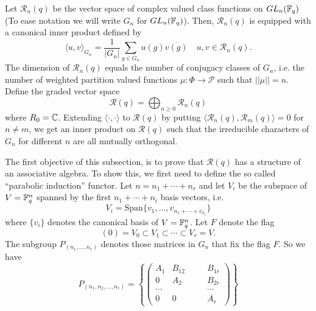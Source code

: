 Let $\mathcal{R}_n(q)$ be the vector space of complex valued class functions on $GL_n(\mathbb{F}_q)$ (To ease notation we will write $G_n$ for $GL_n(\mathbb{F}_q)$). Then, $\mathcal{R}_n(q)$ is equipped with a canonical inner product defined by 
\begin{equation}\label{Equation: inner product for characters}
    \langle u,v\rangle_{G_n}=\frac{1}{|G_n|}\sum_{g\in G_n}u(g)\overline{v(g)}\quad u,v\in \mathcal{R}_n(q).
\end{equation}
The dimension of $\mathcal{R}_n(q)$ equals the number of conjugacy classes of $G_n$, i.e. the number of weighted partition valued functions $\mu:\Phi\rightarrow \mathcal{P}$ such that $||\mu||=n$. Define the graded vector space
\begin{equation}
    \mathcal{R}(q) = \bigoplus_{n\geq0}\mathcal{R}_n(q)
\end{equation}
where $R_0=\mathbb{C}$. Extending $\langle\cdot,\cdot\rangle$ to $\mathcal{R}(q)$ by putting $\langle\mathcal{R}_n(q),\mathcal{R}_m(q)\rangle=0$ for $n\neq m$, we get an inner product on $\mathcal{R}(q)$ such that the irreducible characters of $G_n$ for different $n$ are all mutually orthogonal.\par
The first objective of this subsection, is to prove that $\mathcal{R}(q)$ has a structure of an associative algebra. To show this, we first need to define the so called ``parabolic induction'' functor. Let $n=n_1+\cdots+ n_r$ and let $V_i$ be the subspace of $V=\mathbb{F}_q^n$ spanned by the first $n_1+\cdots +n_i$ basis vectors, i.e.
\begin{equation}\label{equation: definition of the chain of flags}
    V_i=\text{Span}\{v_1,\dots,v_{n_1+\cdots+v_{n_i}}\}
\end{equation}
where $\{v_i\}$ denotes the canonical basis of $V=\mathbb{F}_q^n$. Let $F$ denote the flag
\begin{equation}
    (0)=V_0\subset V_1\subset\cdots\subset V_r=V.
\end{equation}
The subgroup $P_{(n_1,\dots,n_r)}$ denotes those matrices in $G_n$ that fix the flag $F$. So we have
\begin{equation}
    P_{(n_1,n_2,\dots,n_r)}=\left\{\left(\begin{smallmatrix}
        A_1 & B_{12}&\quad &B_{1r}\\
         0 & A_2& &B_{2r}\\
          \cdots& & &\cdots\\
           0 & 0& &A_r
    \end{smallmatrix}\right)\right\}
\end{equation}
